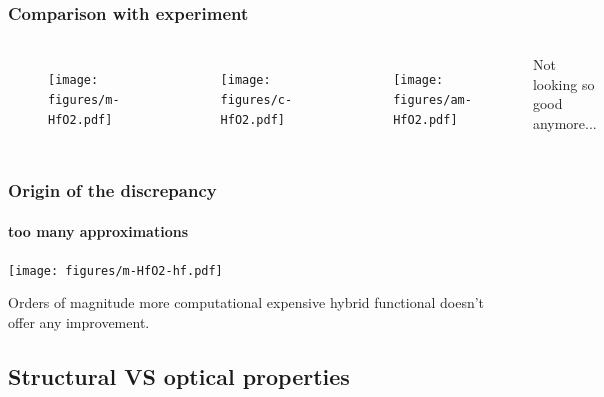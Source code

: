 \documentclass{beamer}
\begin{document}
\begin{frame}
    \frametitle{Comparison with experiment}

	\begin{columns}[c]
	\pause
   \vspace{-0.5cm}

    \begin{figure}
	\texttt{[image: figures/m-HfO2.pdf]}
	\end{figure}

   \pause
   \vspace{-0.7cm}

    \begin{figure}
	\texttt{[image: figures/c-HfO2.pdf]}
	\end{figure}
   \vspace{-0.5cm}


   \pause

    \begin{figure}
	\texttt{[image: figures/am-HfO2.pdf]}
	\end{figure}

   Not looking so good anymore...  

    \end{columns}

\end{frame}


\begin{frame}
    \frametitle{Origin of the discrepancy}
    \framesubtitle{too many approximations}

   \begin{center}
   	\texttt{[image: figures/m-HfO2-hf.pdf]}
   \end{center}

   Orders of magnitude more computational expensive hybrid functional doesn't offer any improvement.

\end{frame}


\subsection{Structural VS optical properties}
\end{document}
